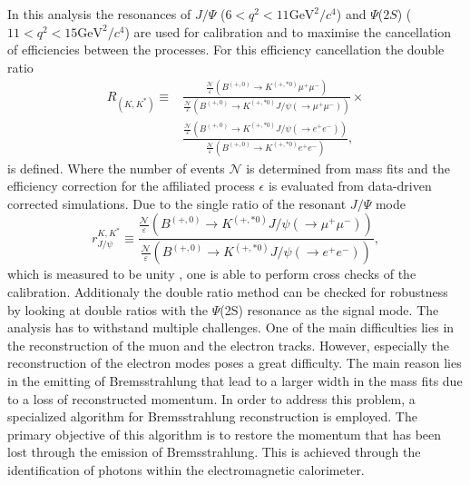 \documentclass[%
 reprint,
 amsmath,amssymb,
 aps,
]{revtex4-2}
\begin{document}
In this analysis the resonances of $J/\Psi$ ($6<q^2<11 \mathrm{GeV}^2 / c^4$) and $\Psi$($2S$) ($11<q^2<15 \mathrm{GeV}^2 / c^4$) are used for calibration  
and to maximise the cancellation of efficiencies between the processes. 
For this efficiency cancellation the double ratio 
\begin{align*}
    R_{\left(K, K^*\right)} \equiv& \frac{\frac{\mathcal{N}}{\varepsilon}\left(B^{(+, 0)} \rightarrow K^{(+, * 0)} \mu^{+} \mu^{-}\right)}{\frac{\mathcal{N}}{\varepsilon}\left(B^{(+, 0)} \rightarrow K^{(+, * 0)} J / \psi\left(\rightarrow \mu^{+} \mu^{-}\right)\right)} \times \\[1pt]
     &\frac{\frac{\mathcal{N}}{\varepsilon}\left(B^{(+, 0)} \rightarrow K^{(+, * 0)} J / \psi\left(\rightarrow e^{+} e^{-}\right)\right)}{\frac{\mathcal{N}}{\varepsilon}\left(B^{(+, 0)} \rightarrow K^{(+, * 0)} e^{+} e^{-}\right)},%
\end{align*}
is defined. Where the number of events $\mathcal{N}$ is determined from mass fits and the efficiency correction for the affiliated process $\epsilon$ is evaluated from
data-driven corrected simulations. Due to the single ratio of the resonant $J/\Psi$ mode 
\begin{equation*}
    r_{J / \psi}^{K, K^*} \equiv \frac{\frac{\mathcal{N}}{\varepsilon}\left(B^{(+, 0)} \rightarrow K^{(+, * 0)} J / \psi\left(\rightarrow \mu^{+} \mu^{-}\right)\right)}{\frac{\mathcal{N}}{\varepsilon}\left(B^{(+, 0)} \rightarrow K^{(+, * 0)} J / \psi\left(\rightarrow e^{+} e^{-}\right)\right)},
\end{equation*}
which is measured to be unity \cite{cali}%
, one is able to perform cross checks of the calibration. Additionaly the double ratio method can be checked for robustness by looking at double ratios with 
the $\Psi$(2S) resonance as the signal mode.
\newline
The analysis has to withstand multiple challenges.
One of the main difficulties lies in the reconstruction of the muon and the electron tracks.
However, especially the reconstruction of the electron modes poses a great difficulty. The main reason lies in the emitting 
of Bremsstrahlung that lead to a larger width in the mass fits due to a loss of reconstructed momentum. 
In order to address this problem, a specialized algorithm for Bremsstrahlung reconstruction is employed. 
The primary objective of this algorithm is to restore the momentum that has been lost through the emission of Bremsstrahlung.
 This is achieved through the identification of photons within the electromagnetic calorimeter. 
\end{document}
